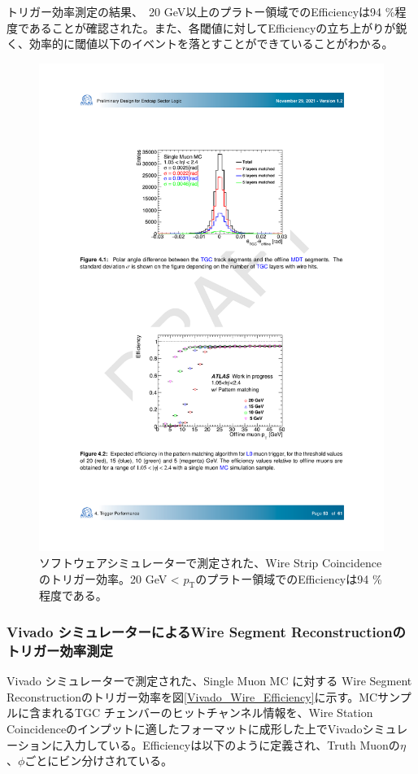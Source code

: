 トリガー効率測定の結果、\pt$\,$ 20 GeV以上のプラトー領域でのEfficiencyは94 \%程度であることが確認された。また、各\pt 閾値に対してEfficiencyの立ち上がりが鋭く、効率的に\pt 閾値以下のイベントを落とすことができていることがわかる。

\begin{figure} 
    \centering
    \includegraphics[width=16cm]{fig/Test/Soft_WS.pdf}
    \caption[ソフトウェアシミュレーターで測定された、Wire Strip Coincidenceのトリガー効率]{ソフトウェアシミュレーターで測定された、Wire Strip Coincidenceのトリガー効率\cite{SLPDR}。20 GeV < $p_\mathrm{T}$のプラトー領域でのEfficiencyは94 \%程度である。}
    \label{Soft_WS}
\end{figure}


\subsubsection*{Vivado シミュレーターによるWire Segment Reconstructionのトリガー効率測定}
Vivado シミュレーターで測定された、Single Muon  MC に対する Wire Segment Reconstructionのトリガー効率を図\ref{Vivado_Wire_Efficiency}に示す。MCサンプルに含まれるTGC チェンバーのヒットチャンネル情報を、Wire Station Coincidenceのインプットに適したフォーマットに成形した上でVivadoシミュレーションに入力している。Efficiencyは以下のように定義され、Truth Muonの$\eta$、$\phi$ごとにビン分けされている。

